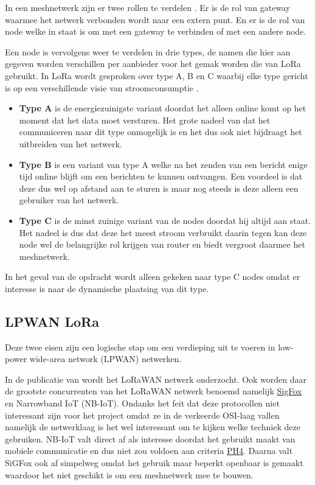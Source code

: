 \documentclass[a4paper, 11pt, oneside]{report}
\begin{document}
In een meshnetwerk zijn er twee rollen te verdelen \cite{compNRF}.
Er is de rol van gateway waarmee het netwerk verbonden wordt naar een extern punt. 
En er is de rol van node welke in staat is om met een gateway te verbinden of met een andere node.

Een node is vervolgens weer te verdelen in drie types, de namen die hier aan gegeven worden verschillen per aanbieder voor het gemak worden die van LoRa gebruikt.
In LoRa wordt gesproken over type A, B en C waarbij elke type gericht is op een verschillende visie van stroomconsumptie \cite{LoraLimit}.

\begin{itemize}
	\item \textbf{Type A} is de energiezuinigste variant doordat het alleen online komt op het moment dat het data moet versturen.
Het grote nadeel van dat het communiceren naar dit type onmogelijk is en het dus ook niet bijdraagt het uitbreiden van het netwerk.
	\item \textbf{Type B} is een variant van type A welke na het zenden van een bericht enige tijd online blijft om een berichten te kunnen ontvangen. 
Een voordeel is dat deze dus wel op afstand aan te sturen is maar nog steeds is deze alleen een gebruiker van het netwerk.
	\item \textbf{Type C} is de minst zuinige variant van de nodes doordat hij altijd aan staat.
Het nadeel is dus dat deze het meest stroom verbruikt daarin tegen kan deze node wel de belangrijke rol krijgen van router en biedt vergroot daarmee het meshnetwerk.
\end{itemize}

In het geval van de opdracht wordt alleen gekeken naar type C nodes omdat er interesse is naar de dynamische plaatsing van dit type.





\subsection{LPWAN LoRa}
Deze twee eisen zijn een logische stap om een verdieping uit te voeren in low-power wide-area network (LPWAN) netwerken.

In de publicatie van \cite{LoraConnect} wordt het LoRaWAN netwerk onderzocht.
Ook worden daar de grootste concurrenten van het LoRaWAN netwerk benoemd namelijk \href{https://www.sigfox.com/en}{SigFox} en Narrowband IoT (NB-IoT).
Ondanks het feit dat deze protocollen niet interessant zijn voor het project omdat ze in de verkeerde OSI-laag vallen namelijk de netwerklaag is het wel interessant om te kijken welke techniek deze gebruiken.
NB-IoT valt direct af als interesse doordat het gebruikt maakt van mobiele communicatie en dus niet zou voldoen aan criteria \hyperlink{ph4}{PH4}.
Daarna valt SiGFox ook af simpelweg omdat het gebruik maar beperkt openbaar is gemaakt waardoor het niet geschikt is om een meshnetwerk mee te bouwen. 
\end{document}
